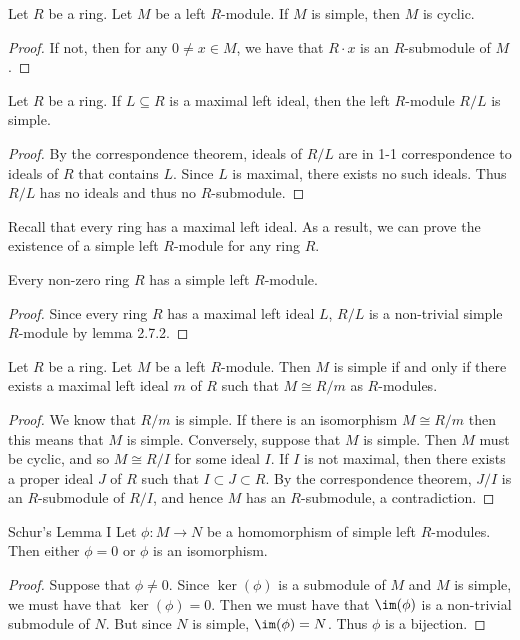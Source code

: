 \documentclass[a4paper]{article}
\begin{document}
\begin{lmm}{}{} Let $R$ be a ring. Let $M$ be a left $R$-module. If $M$ is simple, then $M$ is cyclic. \tcbline
\begin{proof}
If not, then for any $0\neq x\in M$, we have that $R\cdot x$ is an $R$-submodule of $M$. 
\end{proof}
\end{lmm}

\begin{lmm}{}{} Let $R$ be a ring. If $L\subseteq R$ is a maximal left ideal, then the left $R$-module $R/L$ is simple. \tcbline
\begin{proof}
By the correspondence theorem, ideals of $R/L$ are in 1-1 correspondence to ideals of $R$ that contains $L$. Since $L$ is maximal, there exists no such ideals. Thus $R/L$ has no ideals and thus no $R$-submodule. 
\end{proof}
\end{lmm}

Recall that every ring has a maximal left ideal. As a result, we can prove the existence of a simple left $R$-module for any ring $R$. 

\begin{crl}{}{} Every non-zero ring $R$ has a simple left $R$-module. \tcbline
\begin{proof}
Since every ring $R$ has a maximal left ideal $L$, $R/L$ is a non-trivial simple $R$-module by lemma 2.7.2. 
\end{proof}
\end{crl}

\begin{prp}{}{} Let $R$ be a ring. Let $M$ be a left $R$-module. Then $M$ is simple if and only if there exists a maximal left ideal $m$ of $R$ such that $M\cong R/m$ as $R$-modules. \tcbline
\begin{proof}
We know that $R/m$ is simple. If there is an isomorphism $M\cong R/m$ then this means that $M$ is simple. Conversely, suppose that $M$ is simple. Then $M$ must be cyclic, and so $M\cong R/I$ for some ideal $I$. If $I$ is not maximal, then there exists a proper ideal $J$ of $R$ such that $I\subset J\subset R$. By the correspondence theorem, $J/I$ is an $R$-submodule of $R/I$, and hence $M$ has an $R$-submodule, a contradiction. 
\end{proof}
\end{prp}

\begin{prp}{Schur's Lemma I}{} Let $\phi:M\to N$ be a homomorphism of simple left $R$-modules. Then either $\phi=0$ or $\phi$ is an isomorphism. \tcbline
\begin{proof}
Suppose that $\phi\neq 0$. Since $\ker(\phi)$ is a submodule of $M$ and $M$ is simple, we must have that $\ker(\phi)=0$. Then we must have that $\im(\phi)$ is a non-trivial submodule of $N$. But since $N$ is simple, $\im(\phi)=N$. Thus $\phi$ is a bijection. 
\end{proof}
\end{prp}
\end{document}
